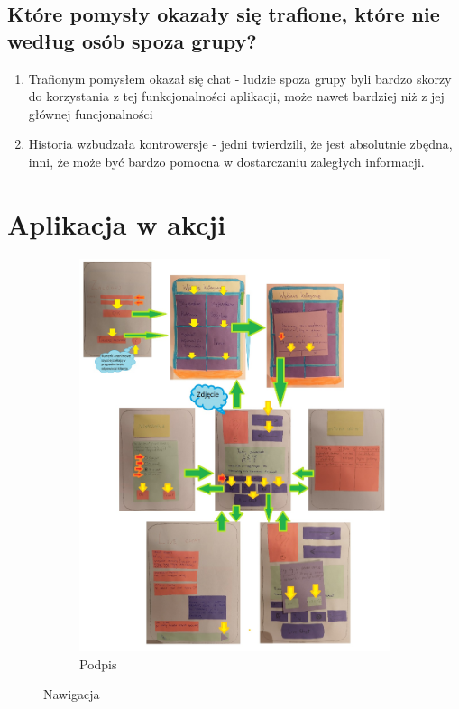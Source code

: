\documentclass[12pt]{article}
\begin{document}
\subsection{Które pomysły okazały się trafione, które nie według osób spoza grupy?}
\begin{enumerate}
	\item Trafionym pomysłem okazał się chat - ludzie spoza grupy byli bardzo skorzy do korzystania z tej funkcjonalności aplikacji, może nawet bardziej niż z jej głównej funcjonalności
	\item Historia wzbudzała kontrowersje - jedni twierdzili, że jest absolutnie zbędna, inni, że może być bardzo pomocna w dostarczaniu zaległych informacji.
\end{enumerate}


\section {Aplikacja w akcji}
\clearpage

\begin{figure}[h!]
	\centering
	\begin{subfigure}[b]{1\linewidth}
		\includegraphics[width=\linewidth]{zdj/mozaika.jpg}
		\caption{Podpis}
	\end{subfigure}
	\label{fig:nuty}
	\caption{Nawigacja}
\end{figure}
\end{document}
